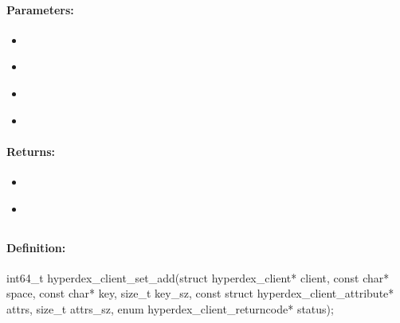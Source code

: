 \paragraph{Parameters:}
\begin{itemize}[noitemsep]
\item {}\\

\item {}\\

\item {}\\

\item {}\\

\end{itemize}

\paragraph{Returns:}
\begin{itemize}[noitemsep]
\item {}\\

\item {}\\

\end{itemize}

\pagebreak
\subsection{}
\label{api:c:set_add}


\paragraph{Definition:}
\begin{ccode}
int64_t hyperdex_client_set_add(struct hyperdex_client* client,
        const char* space,
        const char* key, size_t key_sz,
        const struct hyperdex_client_attribute* attrs, size_t attrs_sz,
        enum hyperdex_client_returncode* status);
\end{ccode}

